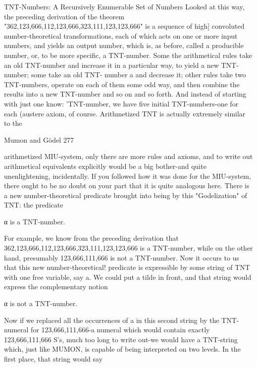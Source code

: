          TNT-Numbers: A Recursively Enumerable Set of Numbers
        Looked at this way, the preceding derivation of the theorem
"362,123,666,112,123,666,323,111,123,123,666" is a sequence of high] convoluted
number-theoretical transformations, each of which acts on one or more input numbers,
and yields an output number, which is, as before, called a producible number, or, to be
more specific, a TNT-number. Some the arithmetical rules take an old TNT-number and
increase it in a particular way, to yield a new TNT-number; some take an old TNT-
number a and decrease it; other rules take two TNT-numbers, operate on each of them
some odd way, and then combine the results into a new TNT-number
and so on and so forth. And instead of starting with just one know: 'TNT-number, we
have five initial TNT-numbers-one for each (austere axiom, of course. Arithmetized TNT
is actually extremely similar to the




Mumon and Gödel                                                                               277

arithmetized MIU-system, only there are more rules and axioms, and to write out
arithmetical equivalents explicitly would be a big bother-and quite unenlightening,
incidentally. If you followed how it was done for the MIU-system, there ought to be no
doubt on your part that it is quite analogous here.
       There is a new number-theoretical predicate brought into being by this
"Godelization" of TNT: the predicate

                                   α is a TNT-number.

For     example,      we     know       from   the     preceding      derivation      that
362,123,666,112,123,666,323,111,123,123,666 is a TNT-number, while on the other
hand, presumably 123,666,111,666 is not a TNT-number.
        Now it occurs to us that this new number-theoretical! predicate is expressible by
some string of TNT with one free variable, say a. We could put a tilde in front, and that
string would express the complementary notion

                                 α is not a TNT-number.

Now if we replaced all the occurrences of a in this second string by the TNT-numeral for
123,666,111,666-a numeral which would contain exactly 123,666,111,666 S's, much too
long to write out-we would have a TNT-string which, just like MUMON, is capable of
being interpreted on two levels. In the first place, that string would say

